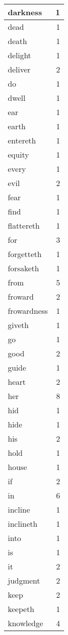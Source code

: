 \begin{center}
\begin{longtable}{l|r}
darkness & 1\\ \hline 
dead & 1\\ \hline 
death & 1\\ \hline 
delight & 1\\ \hline 
deliver & 2\\ \hline 
do & 1\\ \hline 
dwell & 1\\ \hline 
ear & 1\\ \hline 
earth & 1\\ \hline 
entereth & 1\\ \hline 
equity & 1\\ \hline 
every & 1\\ \hline 
evil & 2\\ \hline 
fear & 1\\ \hline 
find & 1\\ \hline 
flattereth & 1\\ \hline 
for & 3\\ \hline 
forgetteth & 1\\ \hline 
forsaketh & 1\\ \hline 
from & 5\\ \hline 
froward & 2\\ \hline 
frowardness & 1\\ \hline 
giveth & 1\\ \hline 
go & 1\\ \hline 
good & 2\\ \hline 
guide & 1\\ \hline 
heart & 2\\ \hline 
her & 8\\ \hline 
hid & 1\\ \hline 
hide & 1\\ \hline 
his & 2\\ \hline 
hold & 1\\ \hline 
house & 1\\ \hline 
if & 2\\ \hline 
in & 6\\ \hline 
incline & 1\\ \hline 
inclineth & 1\\ \hline 
into & 1\\ \hline 
is & 1\\ \hline 
it & 2\\ \hline 
judgment & 2\\ \hline 
keep & 2\\ \hline 
keepeth & 1\\ \hline 
knowledge & 4\\ \hline 

\end{longtable}
\end{center}
